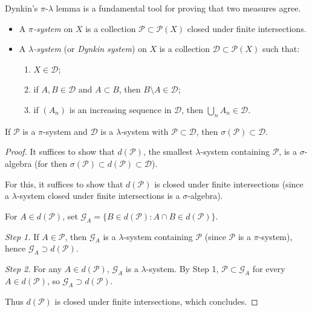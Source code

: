 Dynkin's $\pi$-$\lambda$ lemma is a fundamental tool for proving that two measures
agree.

\begin{definition}
\begin{itemize}
    \item A \emph{$\pi$-system} on $X$ is a collection $\mathcal{P}
    \subset \mathcal{P}(X)$ closed under finite intersections.
    \item A \emph{$\lambda$-system} (or \emph{Dynkin system}) on $X$ is a collection
    $\mathcal{D} \subset \mathcal{P}(X)$ such that:
    \begin{enumerate}
        \item[(i)] $X \in \mathcal{D}$;
        \item[(ii)] if $A, B \in \mathcal{D}$ and $A \subset B$, then
        $B \setminus A \in \mathcal{D}$;
        \item[(iii)] if $(A_n)$ is an increasing sequence in $\mathcal{D}$, then
        $\bigcup_n A_n \in \mathcal{D}$.
    \end{enumerate}
\end{itemize}
\end{definition}

\begin{theorem}
\label{thm:pi_lambda}
If $\mathcal{P}$ is a $\pi$-system and $\mathcal{D}$ is a $\lambda$-system with
$\mathcal{P} \subset \mathcal{D}$, then $\sigma(\mathcal{P}) \subset \mathcal{D}$.
\end{theorem}

\begin{proof}
It suffices to show that $d(\mathcal{P})$, the smallest $\lambda$-system containing
$\mathcal{P}$, is a $\sigma$-algebra (for then
$\sigma(\mathcal{P}) \subset d(\mathcal{P}) \subset \mathcal{D}$).

For this, it suffices to show that $d(\mathcal{P})$ is closed under finite
intersections (since a $\lambda$-system closed under finite intersections is a
$\sigma$-algebra).

For $A \in d(\mathcal{P})$, set
$\mathcal{G}_A = \{B \in d(\mathcal{P}) : A \cap B \in d(\mathcal{P})\}$.

\emph{Step 1.} If $A \in \mathcal{P}$, then $\mathcal{G}_A$ is a $\lambda$-system
containing $\mathcal{P}$ (since $\mathcal{P}$ is a $\pi$-system), hence
$\mathcal{G}_A \supset d(\mathcal{P})$.

\emph{Step 2.} For any $A \in d(\mathcal{P})$, $\mathcal{G}_A$ is a
$\lambda$-system. By Step 1, $\mathcal{P} \subset \mathcal{G}_A$ for every
$A \in d(\mathcal{P})$, so $\mathcal{G}_A \supset d(\mathcal{P})$.

Thus $d(\mathcal{P})$ is closed under finite intersections, which concludes.
\end{proof}

